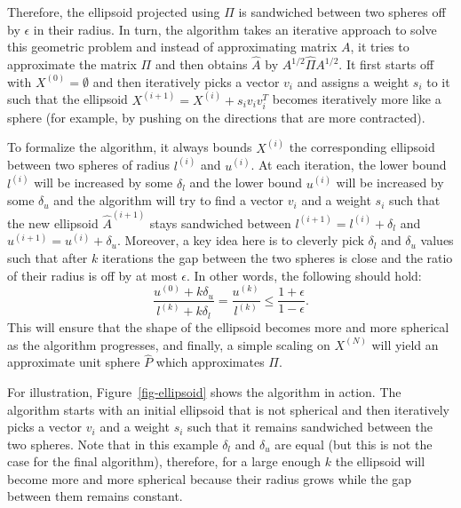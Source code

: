\documentclass[
  letterpaper,
  DIV=11,
  numbers=noendperiod]{scrartcl}
\theoremstyle{plain}
\theoremstyle{plain}
\theoremstyle{plain}
\theoremstyle{definition}
\theoremstyle{plain}
\theoremstyle{remark}
\begin{document}
Therefore, the ellipsoid projected using \(\Pi\) is sandwiched between
two spheres off by \(\epsilon\) in their radius. In turn, the algorithm
takes an iterative approach to solve this geometric problem and instead
of approximating matrix \(A\), it tries to approximate the matrix
\(\Pi\) and then obtains \(\hat{A}\) by \(A^{1/2} \hat{\Pi} A^{1/2}\).
It first starts off with \(X^{(0)} = \emptyset\) and then iteratively
picks a vector \(v_i\) and assigns a weight \(s_i\) to it such that the
ellipsoid \(X^{(i+1)} = X^{(i)} + s_i v_i v_i^T\) becomes iteratively
more like a sphere (for example, by pushing on the directions that are
more contracted).

To formalize the algorithm, it always bounds \(X^{(i)}\) the
corresponding ellipsoid between two spheres of radius \(l^{(i)}\) and
\(u^{(i)}\). At each iteration, the lower bound \(l^{(i)}\) will be
increased by some \(\delta_l\) and the lower bound \(u^{(i)}\) will be
increased by some \(\delta_u\) and the algorithm will try to find a
vector \(v_i\) and a weight \(s_i\) such that the new ellipsoid
\(\hat{A}^{(i+1)}\) stays sandwiched between
\(l^{(i+1)} = l^{(i)} + \delta_l\) and
\(u^{(i+1)} = u^{(i)} + \delta_u\). Moreover, a key idea here is to
cleverly pick \(\delta_l\) and \(\delta_u\) values such that after \(k\)
iterations the gap between the two spheres is close and the ratio of
their radius is off by at most \(\epsilon\). In other words, the
following should hold:
\[\frac{u^{(0)} + k \delta_u}{l^{(k)} + k \delta_l} = \frac{u^{(k)}}{l^{(k)}} \le \frac{1 + \epsilon}{1 - \epsilon}.\]
This will ensure that the shape of the ellipsoid becomes more and more
spherical as the algorithm progresses, and finally, a simple scaling on
\(X^{(N)}\) will yield an approximate unit sphere \(\hat{P}\) which
approximates \(\Pi\).

For illustration, Figure~\ref{fig-ellipsoid} shows the algorithm in
action. The algorithm starts with an initial ellipsoid that is not
spherical and then iteratively picks a vector \(v_i\) and a weight
\(s_i\) such that it remains sandwiched between the two spheres. Note
that in this example \(\delta_l\) and \(\delta_u\) are equal (but this
is not the case for the final algorithm), therefore, for a large enough
\(k\) the ellipsoid will become more and more spherical because their
radius grows while the gap between them remains constant.
\end{document}
